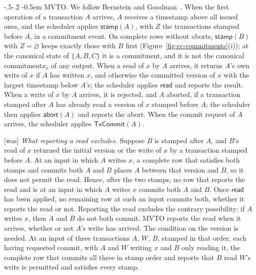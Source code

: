 \documentclass[sigconf]{cidr-2027}
\makeatletter
\theoremstyle{remark}
\renewcommand\paragraph{\@startsection{paragraph}{4}{\z@}%
  {-.5\baselineskip \@plus -2\p@ \@minus -.2\p@}%
  {-0.5em}%
  {\normalfont\bfseries}}
\newcommand{\commitment}{commitment\xspace}
\makeatother
\begin{document}
\paragraph{MVTO.}
We follow Bernstein and Goodman~\cite{bernstein1981concurrency}.  When the
first operation of a transaction $A$ arrives, $A$ receives a timestamp above
all issued ones, and the scheduler applies $\mathsf{stamp}(A)$, with $Z$ the
transactions stamped before $A$, in a \commitment event.  On complete rows
without aborts, $\mathsf{stamp}(B)$ with $Z=\varnothing$ keeps exactly those
with $B$ first (Figure~\ref{fig:cc-commitments}(i)); at the canonical state of
$\{A,B,C\}$ it is a \commitment, and it is not the canonical \commitment $x_o$ of any output.  When
a read of $x$ by $A$ arrives, it returns $A$'s own write of $x$ if $A$ has
written $x$, and otherwise the committed version of $x$ with the largest
timestamp below $A$'s; the scheduler applies $\mathsf{read}$ and reports the
result.  When a write of $x$ by $A$ arrives, it is rejected, and $A$ aborted,
if a transaction stamped after $A$ has already read a version of $x$ stamped
before $A$; the scheduler then applies $\mathsf{abort}(A)$ and reports the
abort.  When the commit request of $A$ arrives, the scheduler applies
$\mathsf{TxCommit}(A)$.



{\footnotesize\color{black!50}\noindent\textsf{[was]} \emph{What reporting a read excludes.}  Suppose $B$ is stamped after $A$, and
$B$'s read of $x$ returned the initial version or the write of $x$ by a
transaction stamped before $A$.  At an input in which $A$ writes $x$, a
complete row that satisfies both stamps and commits both $A$ and $B$ places $A$
between that version and $B$, so it does not permit the read.  Hence, after the
two stamps, no row that reports the read and is at an input in which $A$
writes $x$ commits both $A$ and $B$.  Once $\mathsf{read}$ has been applied, no
remaining row at such an input commits both, whether it reports the read or
not.  Reporting the read excludes the contrary possibility: if $A$ writes $x$, then $A$
and $B$ do not both commit.  MVTO reports the read when it arrives, whether or not
$A$'s write has arrived.  The condition on the version is needed.  At an input of three
transactions $A$, $W$, $B$, stamped in that order, each having requested
commit, with $A$ and $W$ writing $x$ and $B$ only reading it, the complete row
that commits all three in stamp order and reports that $B$ read $W$'s write is
permitted and satisfies every stamp.\par}
\end{document}
